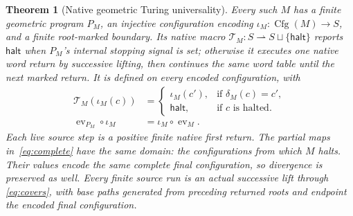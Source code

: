 \documentclass[11pt]{article}
\theoremstyle{definition}
\theoremstyle{plain}
\newtheorem{theorem}[definition]{Theorem}
\newcommand{\ev}{\operatorname{ev}}
\begin{document}
\begin{theorem}[Native geometric Turing universality]\label{thm:universal}
Every such $M$ has a finite geometric program $P_M$, an injective
configuration encoding $\iota_M:\operatorname{Cfg}(M)\to S$, and
a finite root-marked boundary. Its native macro
$\mathcal T_M:S\rightharpoonup S\sqcup\{\mathsf{halt}\}$ reports
$\mathsf{halt}$ when $P_M$'s internal stopping signal is set; otherwise
it executes one native word return by successive lifting, then continues
the same word table until the next marked return. It is defined on
every encoded configuration, with
\begin{align}
 \mathcal T_M(\iota_M(c))&=
 \begin{cases}
  \iota_M(c'),&\text{if }\delta_M(c)=c',\\
  \mathsf{halt},&\text{if }c\text{ is halted}.
 \end{cases}\label{eq:macro}\\
 \ev_{P_M}\circ\iota_M&=\iota_M\circ\ev_M.\label{eq:complete}
\end{align}
Each live source step is a positive finite native first return.
The partial maps in~\eqref{eq:complete} have the same domain: the
configurations from which $M$ halts. Their values encode the same
complete final configuration, so divergence is preserved as well.
Every finite source run is an actual successive lift through
\eqref{eq:covers}, with base paths generated from preceding returned
roots and endpoint the encoded final configuration.
\end{theorem}
\end{document}
